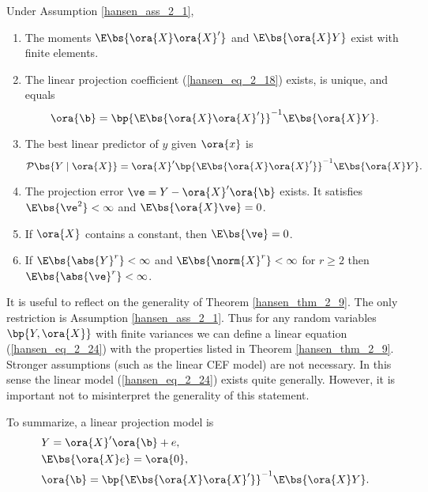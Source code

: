 \begin{theorem}
    \label{hansen_thm_2_9}
    
    Under Assumption \ref{hansen_ass_2_1}, 
    \begin{enumerate}[topsep=10pt, leftmargin=20pt, itemsep=0pt, label=(\arabic*)]
        \setlength{\parskip}{10pt} 
        \item The moments $\E\bs{\ora{X}\ora{X}^\prime}$ and $\E\bs{\ora{X}Y}$ exist with finite elements.
        \item The linear projection coefficient (\ref{hansen_eq_2_18}) exists, is unique, and equals 
        $$\ora{\b} = \bp{\E\bs{\ora{X}\ora{X}^\prime}}^{-1} \E\bs{\ora{X}Y}.$$
        \item The best linear predictor of $y$ given $\ora{x}$ is 
        $$\mathcal{P}\bs{Y \mid \ora{X}} = \ora{X}^\prime \bp{\E\bs{\ora{X}\ora{X}^\prime}}^{-1} \E\bs{\ora{X}Y}.$$
        \item The projection error $\ve = Y - \ora{X}^\prime \ora{\b}$ exists. It satisfies $\E\bs{\ve^2} < \infty$ and $\E\bs{\ora{X}\ve} = 0$. 
        \item If $\ora{X}$ contains a constant, then $\E\bs{\ve} = 0$.
        \item If $\E\bs{\abs{Y}^r} < \infty$ and $\E\bs{\norm{X}^r} < \infty$ for $r \geq 2$ then $\E\bs{\abs{\ve}^r} < \infty$.
    \end{enumerate}
\end{theorem}

It is useful to reflect on the generality of Theorem \ref{hansen_thm_2_9}. The only restriction is Assumption \ref{hansen_ass_2_1}. Thus for any random variables $\bp{Y, \ora{X}}$ with finite variances we can define a linear equation (\ref{hansen_eq_2_24}) with the properties listed in Theorem \ref{hansen_thm_2_9}. Stronger assumptions (such as the linear CEF model) are not necessary. In this sense the linear model (\ref{hansen_eq_2_24}) exists quite generally. However, it is important not to misinterpret the generality of this statement. 

To summarize, a linear projection model is 
\begin{equation}
    \notag 
    \begin{aligned}
        & Y = \ora{X}^{\prime} \ora{\b} + e, \\
        & \E\bs{\ora{X} e} = \ora{0}, \\
        & \ora{\b} = \bp{\E\bs{\ora{X}\ora{X}^{\prime}}}^{-1} \E\bs{\ora{X} Y}.
    \end{aligned}
\end{equation}

